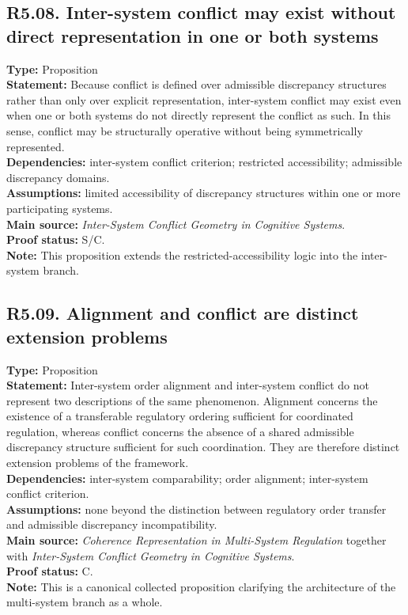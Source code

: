 \documentclass[12pt]{article}
\begin{document}
	\subsection*{R5.08. Inter-system conflict may exist without direct representation in one or both systems}
	\textbf{Type:} Proposition \\
	\textbf{Statement:} Because conflict is defined over admissible discrepancy structures rather
	than only over explicit representation, inter-system conflict may exist even when one or both
	systems do not directly represent the conflict as such. In this sense, conflict may be
	structurally operative without being symmetrically represented. \\
	\textbf{Dependencies:} inter-system conflict criterion; restricted accessibility; admissible
	discrepancy domains. \\
	\textbf{Assumptions:} limited accessibility of discrepancy structures within one or more
	participating systems. \\
	\textbf{Main source:} \emph{Inter-System Conflict Geometry in Cognitive Systems}. \\
	\textbf{Proof status:} S/C. \\
	\textbf{Note:} This proposition extends the restricted-accessibility logic into the inter-system
	branch.
	
	\subsection*{R5.09. Alignment and conflict are distinct extension problems}
	\textbf{Type:} Proposition \\
	\textbf{Statement:} Inter-system order alignment and inter-system conflict do not represent two
	descriptions of the same phenomenon. Alignment concerns the existence of a transferable
	regulatory ordering sufficient for coordinated regulation, whereas conflict concerns the absence
	of a shared admissible discrepancy structure sufficient for such coordination. They are
	therefore distinct extension problems of the framework. \\
	\textbf{Dependencies:} inter-system comparability; order alignment; inter-system conflict
	criterion. \\
	\textbf{Assumptions:} none beyond the distinction between regulatory order transfer and
	admissible discrepancy incompatibility. \\
	\textbf{Main source:} \emph{Coherence Representation in Multi-System Regulation} together with
	\emph{Inter-System Conflict Geometry in Cognitive Systems}. \\
	\textbf{Proof status:} C. \\
	\textbf{Note:} This is a canonical collected proposition clarifying the architecture of the
	multi-system branch as a whole.
	
\end{document}
